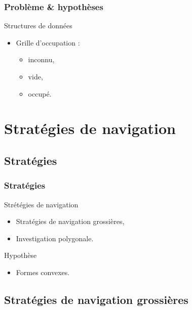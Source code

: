 \documentclass{beamer}
\begin{document}
		\begin{frame}
			\frametitle{Problème \& hypothèses}
			\begin{block}{Structures de données}
				\begin{itemize}
					\item Grille d'occupation :
					\begin{itemize}
						\item inconnu,
						\item vide,
						\item occupé.
					\end{itemize}
				\end{itemize}
			\end{block}
		\end{frame}
	\section{Stratégies de navigation}
		\subsection{Stratégies}
			\begin{frame}
				\frametitle{Stratégies}
				\begin{block}{Strétégies de navigation}
					\begin{itemize}
						\item Stratégies de navigation grossières,
						\item Investigation polygonale.
					\end{itemize}
				\end{block}
				\begin{block}{Hypothèse}
					\begin{itemize}
						\item Formes convexes.
					\end{itemize}
				\end{block}
			\end{frame}
		\subsection{Stratégies de navigation grossières}
\end{document}
